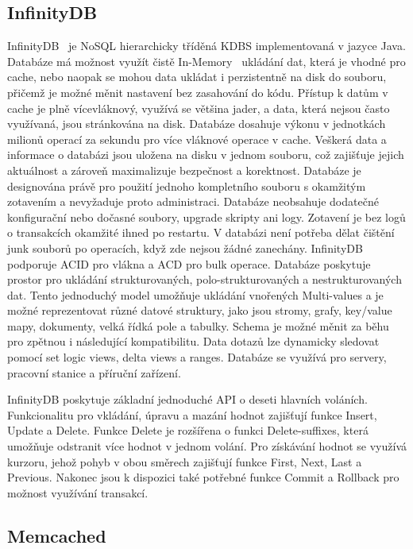\documentclass[czech,master,dept460,male,csharp,cpdeclaration]{diploma}
\begin{document}
	\subsection{InfinityDB}
	
	InfinityDB~\cite{infinitydb} je NoSQL hierarchicky tříděná KDBS implementovaná v jazyce Java. Databáze má možnost využít čistě In-Memory~\cite{inmemory} ukládání dat, která je vhodné pro cache, nebo naopak se mohou data ukládat i perzistentně na disk do souboru, přičemž je možné měnit nastavení bez zasahování do kódu. Přístup k datům v cache je plně vícevláknový, využívá se většina jader, a data, která nejsou často využívaná, jsou stránkována na disk. Databáze dosahuje výkonu v jednotkách milionů operací za sekundu pro více vláknové operace v cache. Veškerá data a informace o databázi jsou uložena na disku v jednom souboru, což zajišťuje jejich aktuálnost a zároveň maximalizuje bezpečnost a korektnost. Databáze je designována právě pro použití jednoho kompletního souboru s okamžitým zotavením a nevyžaduje proto administraci. Databáze neobsahuje dodatečné konfigurační nebo dočasné soubory, upgrade skripty ani logy. Zotavení je bez logů o transakcích okamžité ihned po restartu. V databázi není potřeba dělat čištění junk souborů po operacích, když zde nejsou žádné zanechány. InfinityDB podporuje ACID pro vlákna a ACD pro bulk operace. Databáze poskytuje prostor pro ukládání strukturovaných, polo-strukturovaných a nestrukturovaných dat. Tento jednoduchý model umožňuje ukládání vnořených Multi-values a je možné reprezentovat různé datové struktury, jako jsou stromy, grafy, key/value mapy, dokumenty, velká řídká pole a tabulky. Schema je možné měnit za běhu pro zpětnou i následující kompatibilitu. Data dotazů lze dynamicky sledovat pomocí set logic views, delta views a ranges. Databáze se využívá pro servery, pracovní stanice a příruční zařízení.
	
	InfinityDB poskytuje základní jednoduché API o deseti hlavních voláních. Funkcionalitu pro vkládání, úpravu a mazání hodnot zajišťují funkce Insert, Update a Delete. Funkce Delete je rozšířena o funkci Delete-suffixes, která umožňuje odstranit více hodnot v jednom volání. Pro získávání hodnot se využívá kurzoru, jehož pohyb v obou směrech zajišťují funkce First, Next, Last a Previous. Nakonec jsou k dispozici také potřebné funkce Commit a Rollback pro možnost využívání transakcí.
	
	\subsection{Memcached} \label{lab-memcached}
	
\end{document}
